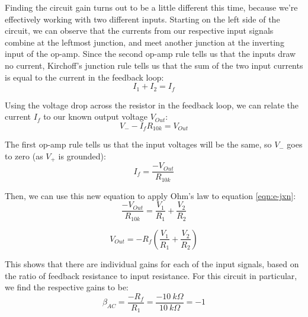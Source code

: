 \documentclass[11pt]{article}
\begin{document}
Finding the circuit gain turns out to be a little different this time, because we're effectively working with two different inputs. Starting on the left side of the circuit, we can observe that the currents from our respective input signals combine at the leftmost junction, and meet another junction at the inverting input of the op-amp. Since the second op-amp rule tells us that the inputs draw no current, Kirchoff's junction rule tells us that the sum of the two input currents is equal to the current in the feedback loop:\\

\begin{equation}
    I_1 + I_2 = I_f
    \label{eqn:e-jxn}
\end{equation}

Using the voltage drop across the resistor in the feedback loop, we can relate the current $I_f$ to our known output voltage $V_{Out}$:\\

\begin{equation}
    V_{-} - I_f R_{10k} = V_{Out}
\end{equation}

The first op-amp rule tells us that the input voltages will be the same, so $V_{-}$ goes to zero (as $V_{+}$ is grounded):\\

\begin{equation}
    I_f = \frac{-V_{Out}}{R_{10k}}
\end{equation}

Then, we can use this new equation to apply Ohm's law to equation \ref{eqn:e-jxn}:\\

\begin{equation}
    \frac{-V_{Out}}{R_{10k}} = \frac{V_1}{R_1} + \frac{V_2}{R_2}
\end{equation}

\begin{equation}
    V_{Out} = -R_f (\frac{V_1}{R_1} + \frac{V_2}{R_2})
\end{equation}

This shows that there are individual gains for each of the input signals, based on the ratio of feedback resistance to input resistance. For this circuit in particular, we find the respective gains to be:\\

\begin{equation}
    \beta_{AC} = \frac{-R_f}{R_1} = \frac{-10\ k \Omega}{10\ k \Omega} = -1
\end{equation}
\end{document}
